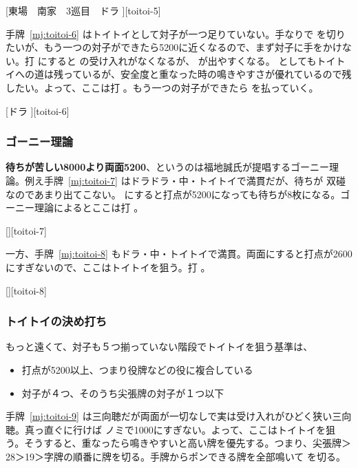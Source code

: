 \documentclass[../nankiru_main.tex]{subfiles}
\begin{document}
[東場　南家　3巡目　ドラ ][toitoi-5]

手牌~\ref{mj:toitoi-6} はトイトイとして対子が一つ足りていない。手なりで  を切りたいが、もう一つの対子ができたら5200に近くなるので、まず対子に手をかけない。打  にすると  の受け入れがなくなるが、 が出やすくなる。 としてもトイトイへの道は残っているが、安全度と重なった時の鳴きやすさが優れているので残したい。よって、ここは打 。もう一つの対子ができたら  を払っていく\citep[][p.~58]{zero-teyaku}。

[ドラ ][toitoi-6]


\subsubsection*{ゴーニー理論}

\textbf{待ちが苦しい8000より両面5200}、というのは福地誠氏が提唱するゴーニー理論\citep{yoteru-toitoi}。例え手牌~\ref{mj:toitoi-7} はドラドラ・中・トイトイで満貫だが、待ちが  双碰なのであまり出てこない。 にすると打点が5200になっても待ちが8枚になる。ゴーニー理論によるとここは打 。

[][toitoi-7]

一方、手牌~\ref{mj:toitoi-8} もドラ・中・トイトイで満貫。両面にすると打点が2600にすぎないので、ここはトイトイを狙う。打 。

[][toitoi-8]


\subsubsection*{トイトイの決め打ち}

もっと遠くて、対子も５つ揃っていない階段でトイトイを狙う基準は\citep[][p.~59]{zero-teyaku}、

\begin{itemize}
\item 打点が5200以上、つまり役牌などの役に複合している
\item 対子が４つ、そのうち尖張牌の対子が１つ以下
\end{itemize}

手牌~\ref{mj:toitoi-9} は三向聴だが両面が一切なしで実は受け入れがひどく狭い三向聴。真っ直ぐに行けば  ノミで1000にすぎない。よって、ここはトイトイを狙う。そうすると、重なったら鳴きやすいと高い牌を優先する。つまり、尖張牌＞28＞19＞字牌の順番に牌を切る。手牌からポンできる牌を全部鳴いて  を切る。
\end{document}
